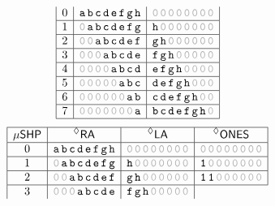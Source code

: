 \begin{figure}[!h]
\[\begin{array}{|c|r|l|}
        0
        &\texttt{a\,b\,c\,d\,e\,f\,g\,h}
        &\texttt{\gray{0\,0\,0\,0\,0\,0\,0\,0}}
        \\ \hline
        1
        &\texttt{\gray{0\,}a\,b\,c\,d\,e\,f\,g}
        &\texttt{h\,\gray{0\,0\,0\,0\,0\,0\,0}}
        \\ \hline
        2
        &\texttt{\gray{0\,0\,}a\,b\,c\,d\,e\,f}
        &\texttt{g\,h\,\gray{0\,0\,0\,0\,0\,0}}
        \\ \hline
        3
        &\texttt{\gray{0\,0\,0\,}a\,b\,c\,d\,e}
        &\texttt{f\,g\,h\,\gray{0\,0\,0\,0\,0}}
        \\ \hline
        4
        &\texttt{\gray{0\,0\,0\,0\,}a\,b\,c\,d}
        &\texttt{e\,f\,g\,h\,\gray{0\,0\,0\,0}}
        \\ \hline
        5
        &\texttt{\gray{0\,0\,0\,0\,0\,}a\,b\,c}
        &\texttt{d\,e\,f\,g\,h\,\gray{0\,0\,0}}
        \\ \hline
        6
        &\texttt{\gray{0\,0\,0\,0\,0\,0\,}a\,b}
        &\texttt{c\,d\,e\,f\,g\,h\,\gray{0\,0}}
        \\ \hline
        7
        &\texttt{\gray{0\,0\,0\,0\,0\,0\,0\,}a}
        &\texttt{b\,c\,d\,e\,f\,g\,h\,\gray{0}}
        \\ \hline
    \end{array}
\]
\centering
\[
    \begin{array}{|c|c|c|c|}
        \hline
        \mshp{} & \multicolumn{1}{c|}{\decoded{\ra}} & \multicolumn{1}{c|}{\decoded{\la}} & \ONES{} \\ %
        \hline
        0
        & \texttt{a\,b\,c\,d\,e\,f\,g\,h}
        & \texttt{\gray{0\,0\,0\,0\,0\,0\,0\,0}}
        & \texttt{\gray{0\,0\,0\,0\,0\,0\,0\,0}} \\
        \hline
        1
        & \texttt{\gray{0}\,a\,b\,c\,d\,e\,f\,g}
        & \texttt{h\,\gray{0\,0\,0\,0\,0\,0\,0}}
        & \texttt{1\,\gray{0\,0\,0\,0\,0\,0\,0}} \\
        \hline
        2
        & \texttt{\gray{0\,0}\,a\,b\,c\,d\,e\,f}
        & \texttt{g\,h\,\gray{0\,0\,0\,0\,0\,0}}
        & \texttt{1\,1\,\gray{0\,0\,0\,0\,0\,0}} \\
        \hline
        3
        & \texttt{\gray{0\,0\,0}\,a\,b\,c\,d\,e}
        & \texttt{f\,g\,h\,\gray{0\,0\,0\,0\,0}}

\end{array}\]
\end{figure}
